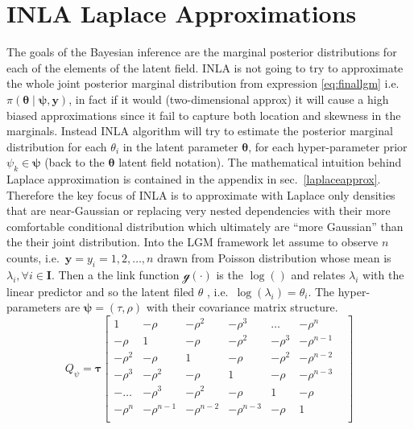 \documentclass[
  12pt,
  a4paper,
  oneside]{book}
\theoremstyle{definition}
\theoremstyle{definition}
\theoremstyle{definition}
\theoremstyle{remark}
\begin{document}
\hypertarget{approx}{%
\section{INLA Laplace Approximations}\label{approx}}

The goals of the Bayesian inference are the marginal posterior distributions for each of the elements of the latent field. INLA is not going to try to approximate the whole joint posterior marginal distribution from expression \eqref{eq:finallgm} i.e.~\(\pi(\boldsymbol{\theta} \mid \boldsymbol{\psi}, \boldsymbol{\mathbf{y}})\), in fact if it would (two-dimensional approx) it will cause a high biased approximations since it fail to capture both location and skewness in the marginals. Instead INLA algorithm will try to estimate the posterior marginal distribution for each \(\theta_{i}\) in the latent parameter \(\boldsymbol{\theta}\), for each hyper-parameter prior \(\psi_{k} \in \boldsymbol\psi\) (back to the \(\boldsymbol\theta\) latent field notation). The mathematical intuition behind Laplace approximation is contained in the appendix in sec.~\ref{laplaceapprox}.
Therefore the key focus of INLA is to approximate with Laplace only densities that are near-Gaussian \citeyearpar{wang2018bayesian} or replacing very nested dependencies with their more comfortable conditional distribution which ultimately are ``more Gaussian'' than the their joint distribution.
Into the LGM framework let assume to observe \(n\) counts, i.e.~\(\mathbf{y} = y_i = 1,2, \ldots, n\) drawn from Poisson distribution whose mean is \(\lambda_i, \forall i \in \mathbf{I}\). Then a the link function \(\mathscr{g}(\cdot)\) is the \(\log()\) and relates \(\lambda_i\) with the linear predictor and so the latent filed \(\theta\) , i.e.~\(\log(\lambda_i)=\theta_{i}\). The hyper-parameters are \(\boldsymbol\psi = (\tau, \rho)\) with their covariance matrix structure.
\[
Q_{\psi}=\boldsymbol\tau\begin{bmatrix}
1 & - \rho & - \rho^{2} & - \rho^{3} & \ldots & - \rho^{n} &  \\
- \rho & 1 & - \rho & - \rho^{2} & - \rho^{3} & - \rho^{n-1} & \\
- \rho^{2} & - \rho & 1 & - \rho & - \rho^{2} & - \rho^{n-2} &  \\
- \rho^{3} & - \rho^{2} & - \rho & 1 & - \rho & - \rho^{n-3} &  \\
- \ldots & - \rho^{3} & - \rho^{2} & - \rho & 1 & - \rho &  \\
- \rho^{n} & - \rho^{n-1} & - \rho^{n-2} & - \rho^{n-3} & - \rho & 1 \\
\end{bmatrix}
\]
\end{document}

